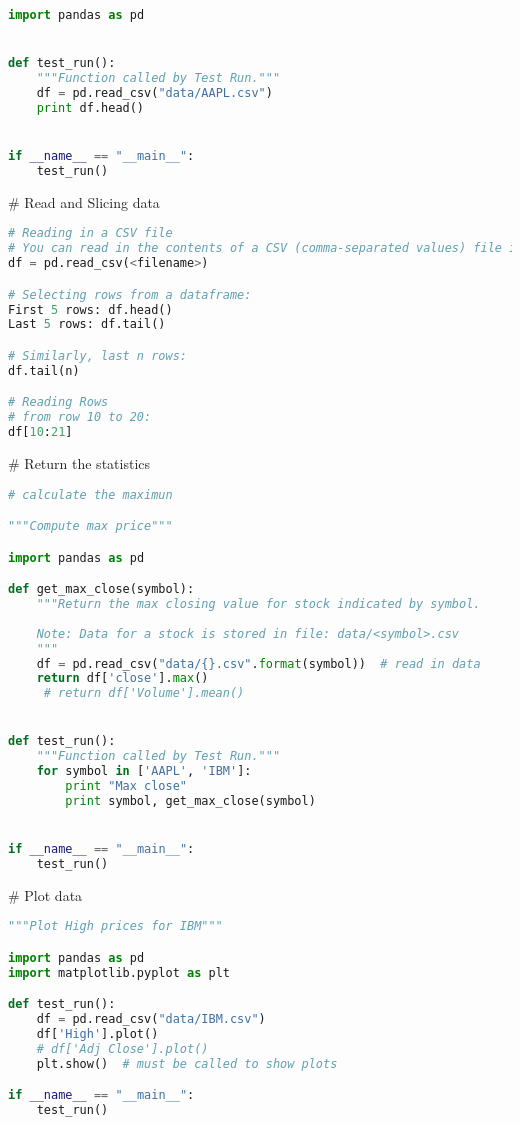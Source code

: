 \documentclass{article}
\begin{document}
\begin{lstlisting}[language=Python, caption=Python example]
import pandas as pd


def test_run():
    """Function called by Test Run."""
    df = pd.read_csv("data/AAPL.csv")
    print df.head()


if __name__ == "__main__":
    test_run()
\end{lstlisting}

\# Read and Slicing data
\begin{lstlisting}[language=Python, caption=Python example]
# Reading in a CSV file
# You can read in the contents of a CSV (comma-separated values) file into a Pandas dataframe using:
df = pd.read_csv(<filename>)

# Selecting rows from a dataframe:
First 5 rows: df.head()
Last 5 rows: df.tail()

# Similarly, last n rows: 
df.tail(n)

# Reading Rows
# from row 10 to 20:
df[10:21] 
\end{lstlisting}


\# Return the statistics
\begin{lstlisting}[language=Python, caption=Python example]
# calculate the maximun

"""Compute max price"""

import pandas as pd

def get_max_close(symbol):
    """Return the max closing value for stock indicated by symbol.
    
    Note: Data for a stock is stored in file: data/<symbol>.csv
    """
    df = pd.read_csv("data/{}.csv".format(symbol))  # read in data
    return df['close'].max()
     # return df['Volume'].mean()


def test_run():
    """Function called by Test Run."""
    for symbol in ['AAPL', 'IBM']:
        print "Max close"
        print symbol, get_max_close(symbol)


if __name__ == "__main__":
    test_run()
\end{lstlisting}

\# Plot data
\begin{lstlisting}[language=Python, caption=Python example]
"""Plot High prices for IBM"""

import pandas as pd
import matplotlib.pyplot as plt

def test_run():
    df = pd.read_csv("data/IBM.csv")
    df['High'].plot()
    # df['Adj Close'].plot()
    plt.show()  # must be called to show plots

if __name__ == "__main__":
    test_run()
\end{lstlisting}
\end{document}
